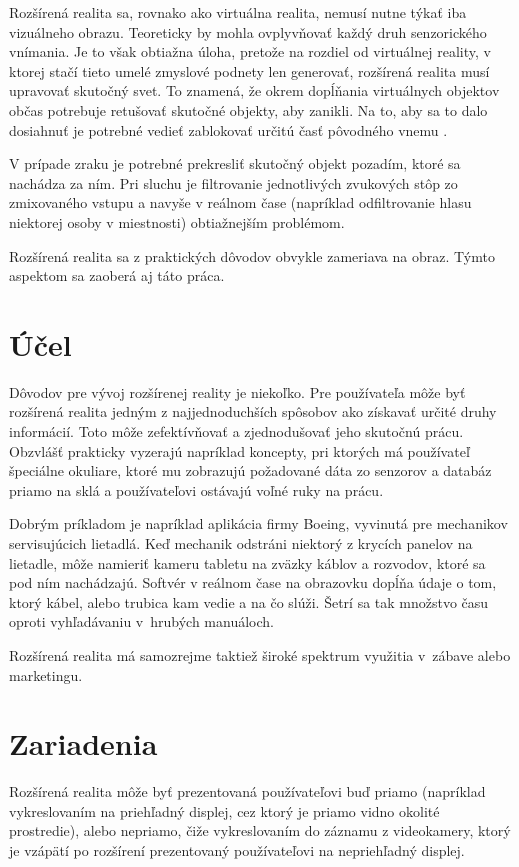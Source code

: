 Rozšírená realita sa, rovnako ako virtuálna realita, nemusí nutne týkať iba vizuálneho obrazu. Teoreticky by mohla ovplyvňovať každý druh senzorického vnímania. Je to však obtiažna úloha, pretože na rozdiel od virtuálnej reality, v
ktorej stačí tieto umelé zmyslové podnety len generovať, rozšírená realita musí upravovať skutočný svet. To znamená, že okrem dopĺňania virtuálnych objektov občas potrebuje retušovať skutočné objekty, aby zanikli. Na to, aby sa to dalo dosiahnuť je potrebné vedieť zablokovať určitú časť pôvodného vnemu \cite{Bimber05}.

V prípade zraku je potrebné prekresliť skutočný objekt pozadím, ktoré sa nachádza za ním. Pri sluchu je filtrovanie jednotlivých zvukových stôp zo zmixovaného vstupu a navyše v reálnom čase (napríklad odfiltrovanie hlasu niektorej osoby v miestnosti) obtiažnejším problémom.

Rozšírená realita sa z praktických dôvodov obvykle zameriava na obraz. Týmto aspektom sa zaoberá aj táto práca.

\section{Účel}

Dôvodov pre vývoj rozšírenej reality je niekoľko. Pre používateľa môže byť rozšírená realita jedným z najjednoduchších spôsobov ako získavať určité druhy
informácií. Toto môže zefektívňovať a zjednodušovať jeho skutočnú prácu. Obzvlášť prakticky vyzerajú napríklad koncepty, pri ktorých má používateľ špeciálne okuliare, ktoré mu zobrazujú požadované dáta zo senzorov a databáz priamo na sklá a používateľovi ostávajú voľné ruky na prácu.

Dobrým príkladom je napríklad aplikácia firmy Boeing, vyvinutá pre mechanikov servisujúcich lietadlá. Keď mechanik odstráni niektorý z krycích panelov na lietadle, môže namieriť kameru tabletu na zväzky káblov a rozvodov, ktoré sa pod ním nachádzajú. Softvér v reálnom čase na obrazovku dopĺňa údaje o tom, ktorý kábel, alebo trubica kam vedie a na čo slúži. Šetrí sa tak množstvo času oproti vyhľadávaniu v~hrubých manuáloch.

Rozšírená realita má samozrejme taktiež široké spektrum využitia v~zábave alebo marketingu.

\section{Zariadenia}

Rozšírená realita môže byť prezentovaná používateľovi buď priamo (napríklad vykreslovaním na priehľadný displej, cez ktorý je priamo vidno okolité prostredie), alebo nepriamo, čiže vykreslovaním do záznamu z videokamery, ktorý je vzápätí po rozšírení prezentovaný používateľovi na nepriehľadný displej.

